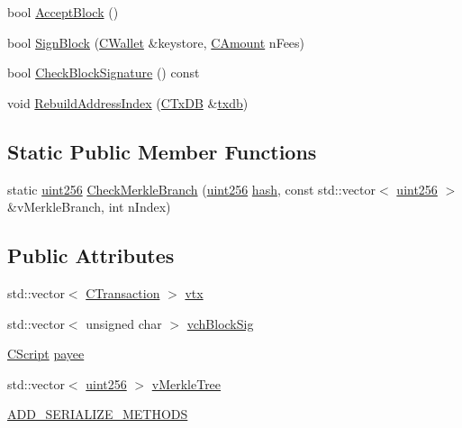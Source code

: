 \begin{DoxyCompactItemize}
\item 
bool \hyperlink{class_c_block_a3f990a713116bd15c1f221c88b012ccf}{Accept\+Block} ()
\item 
bool \hyperlink{class_c_block_a5a6b04461fc7ab5b21f00d6c403e35dd}{Sign\+Block} (\hyperlink{class_c_wallet}{C\+Wallet} \&keystore, \hyperlink{amount_8h_a4eaf3a5239714d8c45b851527f7cb564}{C\+Amount} n\+Fees)
\item 
bool \hyperlink{class_c_block_a7e0103e7a0117173cb9c975702e06392}{Check\+Block\+Signature} () const 
\item 
void \hyperlink{class_c_block_aea2c77ad84cd7909720f75a0c3f7ddc2}{Rebuild\+Address\+Index} (\hyperlink{class_c_tx_d_b}{C\+Tx\+D\+B} \&\hyperlink{txdb-leveldb_8cpp_a72eff8ae1d84de13daf97a61b8c02bc6}{txdb})
\end{DoxyCompactItemize}
\subsection*{Static Public Member Functions}
\begin{DoxyCompactItemize}
\item 
static \hyperlink{classuint256}{uint256} \hyperlink{class_c_block_ab0d596c51fb317e3cb6f444015a652a5}{Check\+Merkle\+Branch} (\hyperlink{classuint256}{uint256} \hyperlink{cache_8cc_a11ecb029164e055f28f4123ce3748862}{hash}, const std\+::vector$<$ \hyperlink{classuint256}{uint256} $>$ \&v\+Merkle\+Branch, int n\+Index)
\end{DoxyCompactItemize}
\subsection*{Public Attributes}
\begin{DoxyCompactItemize}
\item 
std\+::vector$<$ \hyperlink{class_c_transaction}{C\+Transaction} $>$ \hyperlink{class_c_block_a9b6508d662722775f3029b980b382b66}{vtx}
\item 
std\+::vector$<$ unsigned char $>$ \hyperlink{class_c_block_a78f882e24c4416f42039cbc6a67faf6e}{vch\+Block\+Sig}
\item 
\hyperlink{class_c_script}{C\+Script} \hyperlink{class_c_block_a1604a6d25f313ab1bf4e3777a6cba948}{payee}
\item 
std\+::vector$<$ \hyperlink{classuint256}{uint256} $>$ \hyperlink{class_c_block_a019ae6579acd08974653d3f443dd398a}{v\+Merkle\+Tree}
\item 
\hyperlink{class_c_block_a53ba28b86cf6c5b1de640941786fa3b8}{A\+D\+D\+\_\+\+S\+E\+R\+I\+A\+L\+I\+Z\+E\+\_\+\+M\+E\+T\+H\+O\+D\+S}
\end{DoxyCompactItemize}
